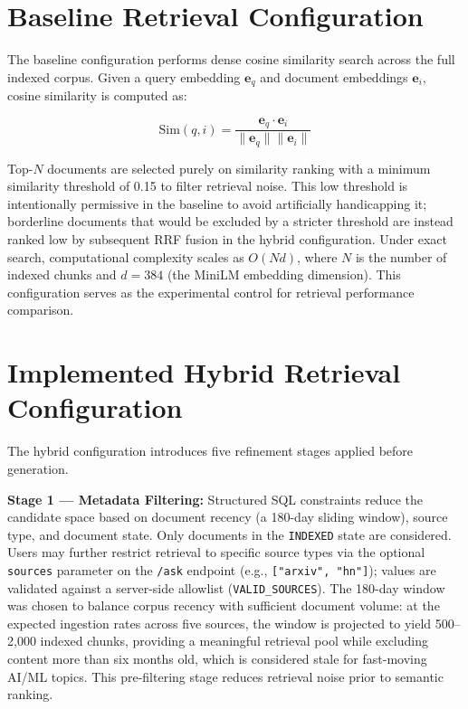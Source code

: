 \section{Baseline Retrieval Configuration}
\label{sec:baseline}

The baseline configuration performs dense cosine similarity search across the full indexed corpus. Given a query embedding $\mathbf{e}_q$ and document embeddings $\mathbf{e}_i$, cosine similarity is computed as:

\begin{equation}
  \text{Sim}(q, i) = \frac{\mathbf{e}_q \cdot \mathbf{e}_i}{\|\mathbf{e}_q\|\|\mathbf{e}_i\|}
  \label{eq:cosine}
\end{equation}

Top-$N$ documents are selected purely on similarity ranking with a minimum similarity threshold of 0.15 to filter retrieval noise. This low threshold is intentionally permissive in the baseline to avoid artificially handicapping it; borderline documents that would be excluded by a stricter threshold are instead ranked low by subsequent RRF fusion in the hybrid configuration. Under exact search, computational complexity scales as $O(Nd)$, where $N$ is the number of indexed chunks and $d = 384$ (the MiniLM embedding dimension). This configuration serves as the experimental control for retrieval performance comparison.

\section{Implemented Hybrid Retrieval Configuration}
\label{sec:hybrid}

The hybrid configuration introduces five refinement stages applied before generation.

\textbf{Stage 1 --- Metadata Filtering:} Structured SQL constraints reduce the candidate space based on document recency (a 180-day sliding window), source type, and document state. Only documents in the \texttt{INDEXED} state are considered. Users may further restrict retrieval to specific source types via the optional \texttt{sources} parameter on the \texttt{/ask} endpoint (e.g., \texttt{["arxiv",\,"hn"]}); values are validated against a server-side allowlist (\texttt{VALID\_SOURCES}). The 180-day window was chosen to balance corpus recency with sufficient document volume: at the expected ingestion rates across five sources, the window is projected to yield 500--2,000 indexed chunks, providing a meaningful retrieval pool while excluding content more than six months old, which is considered stale for fast-moving AI/ML topics. This pre-filtering stage reduces retrieval noise prior to semantic ranking.

